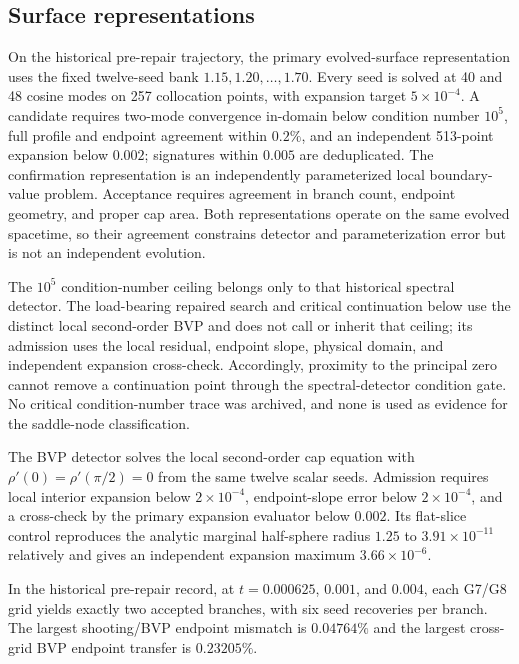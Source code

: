 \documentclass[11pt]{article}
\begin{document}
\subsection{Surface representations}

On the historical pre-repair trajectory, the primary evolved-surface
representation uses the fixed twelve-seed bank
$1.15,1.20,\ldots,1.70$.  Every seed is solved at 40 and 48 cosine modes on
257 collocation points, with expansion target $5\times10^{-4}$.  A candidate
requires two-mode convergence in-domain below condition number $10^5$, full
profile and endpoint agreement within $0.2\%$, and an independent 513-point
expansion below $0.002$; signatures within $0.005$ are deduplicated.  The
confirmation representation is an independently
parameterized local boundary-value problem.  Acceptance requires agreement in
branch count, endpoint geometry, and proper cap area.  Both representations
operate on the same evolved spacetime, so their agreement constrains detector
and parameterization error but is not an independent evolution.

The $10^5$ condition-number ceiling belongs only to that historical spectral
detector.  The load-bearing repaired search and critical continuation below
use the distinct local second-order BVP and
does not call or inherit that ceiling; its admission uses the local residual,
endpoint slope, physical domain, and independent expansion cross-check.
Accordingly, proximity to the principal zero cannot remove a continuation
point through the spectral-detector condition gate.  No critical
condition-number trace was archived, and none is used as evidence for the
saddle-node classification.

The BVP detector solves the local second-order cap equation with
$\rho'(0)=\rho'(\pi/2)=0$ from the same twelve scalar seeds.  Admission
requires local interior expansion below $2\times10^{-4}$, endpoint-slope error
below $2\times10^{-4}$, and a cross-check by the primary expansion evaluator
below $0.002$.  Its flat-slice control reproduces the analytic marginal
half-sphere radius $1.25$ to $3.91\times10^{-11}$ relatively and gives an
independent expansion maximum $3.66\times10^{-6}$.

In the historical pre-repair record, at $t=0.000625$, $0.001$, and $0.004$,
each G7/G8 grid yields exactly two accepted branches, with six seed recoveries
per branch.  The largest
shooting/BVP endpoint mismatch is $0.04764\%$ and the largest cross-grid BVP
endpoint transfer is $0.23205\%$.
\end{document}
